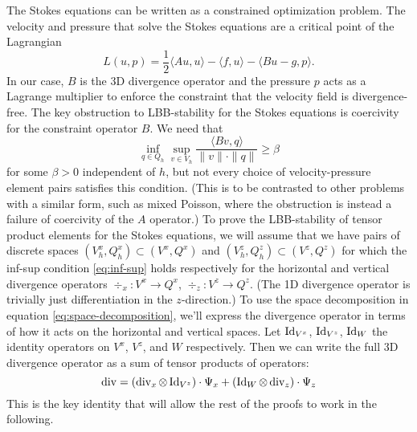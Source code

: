 \documentclass{article}
\theoremstyle{definition}
\theoremstyle{plain}
\renewcommand{\div}[1]{\operatorname{div} #1} %
\newcommand{\Id}[1]{\operatorname{Id} #1}
\begin{document}
The Stokes equations can be written as a constrained optimization problem.
The velocity and pressure that solve the Stokes equations are a critical point of the Lagrangian
\begin{equation}
    L(u, p) = \frac{1}{2}\langle Au, u\rangle - \langle f, u\rangle - \langle Bu - g, p\rangle.
\end{equation}
In our case, $B$ is the 3D divergence operator and the pressure $p$ acts as a Lagrange multiplier to enforce the constraint that the velocity field is divergence-free.
The key obstruction to LBB-stability for the Stokes equations is coercivity for the constraint operator $B$.
We need that
\begin{equation}
    \inf_{q\in Q_h}\sup_{v\in V_h}\frac{\langle Bv, q\rangle}{\|v\|\cdot\|q\|} \ge \beta
    \label{eq:inf-sup}
\end{equation}
for some $\beta > 0$ independent of $h$, but not every choice of velocity-pressure element pairs satisfies this condition.
(This is to be contrasted to other problems with a similar form, such as mixed Poisson, where the obstruction is instead a failure of coercivity of the $A$ operator.)
To prove the LBB-stability of tensor product elements for the Stokes equations, we will assume that we have pairs of discrete spaces $(V_h^x, Q_h^x) \subset (V^x, Q^x)$ and $(V_h^z, Q_h^z) \subset (V^z, Q^z)$ for which the inf-sup condition \eqref{eq:inf-sup} holds respectively for the horizontal and vertical divergence operators $\div_x : V^x \to Q^x$, $\div_z : V^z \to Q^z$.
(The 1D divergence operator is trivially just differentiation in the $z$-direction.)
To use the space decomposition in equation \eqref{eq:space-decomposition}, we'll express the divergence operator in terms of how it acts on the horizontal and vertical spaces.
Let $\Id_{V^x}$, $\Id_{V^z}$, $\Id_W$ the identity operators on $V^x$, $V^z$, and $W$ respectively.
Then we can write the full 3D divergence operator as a sum of tensor products of operators:
\begin{equation}
    \div = (\div_x \otimes \Id_{V^z})\cdot\Psi_x + (\Id_W \otimes \div_z)\cdot\Psi_z
    \label{eq:divergence}
\end{equation}
This is the key identity that will allow the rest of the proofs to work in the following.
\end{document}
